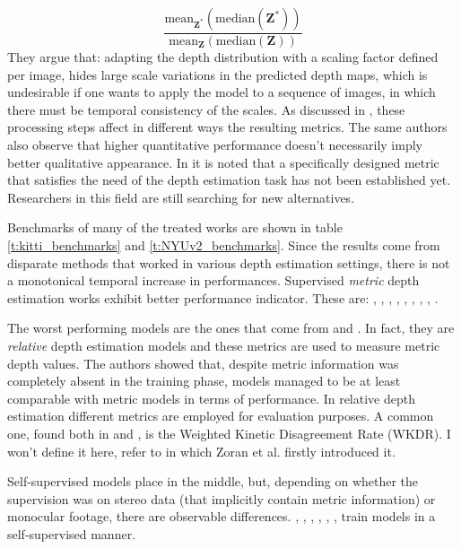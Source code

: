 \[
	\frac{
		\text{mean}_{\mathbf{Z}^{*}} (\text{median} ( \mathbf{Z}^{*}))
	}{
		\text{mean}_{\mathbf{Z}} (\text{median} ( \mathbf{Z}))
	}
\]
They argue that: adapting the depth distribution with a scaling factor defined per image, hides large scale variations in the predicted depth maps, which is undesirable if one wants to apply the model to a sequence of images, in which there must be temporal consistency of the scales.
As discussed in \cite{evalStudy}, these processing steps affect in different ways the resulting metrics.
The same authors also observe that higher quantitative performance doesn't necessarily imply better qualitative appearance.
In \cite{monocular2024} it is noted that a specifically designed metric that satisfies the need of the depth estimation task has not been established yet.
Researchers in this field are still searching for new alternatives.

\vspace{0.5cm}

Benchmarks of many of the treated works are shown in table \ref{t:kitti_benchmarks} and \ref{t:NYUv2_benchmarks}.
Since the results come from disparate methods that worked in various depth estimation settings, there is not a monotonical temporal increase in performances.
Supervised \textit{metric} depth estimation works exhibit better performance indicator.
These are: \cite{Eigen}, \cite{Eigen2}, \cite{depth_as_classification}, \cite{ordinal_regression}, \cite{denseViT}, \cite{AdaBins}, \cite{Laina}, \cite{LocalBins}, \cite{ZoeDepth}.

The worst performing models are the ones that come from \cite{DIW} and \cite{ReDWeb}.
In fact, they are \textit{relative} depth estimation models and these metrics are used to measure metric depth values.
The authors showed that, despite metric information was completely absent in the training phase, models managed to be at least comparable with metric models in terms of performance.
In relative depth estimation different metrics are employed for evaluation purposes.
A common one, found both in \cite{DIW} and \cite{ReDWeb}, is the Weighted Kinetic Disagreement Rate (WKDR).
I won't define it here, refer to \cite{Zoran} in which Zoran et al. firstly introduced it.

Self-supervised models place in the middle, but, depending on whether the supervision was on stereo data (that implicitly contain metric information) or monocular footage, there are observable differences.
\cite{Garg}, \cite{MonoDepth}, \cite{MonoDepth2}, \cite{struct2depth}, \cite{vid2depth}, \cite{FeatDepth}, \cite{SfMLearner} train models in a self-supervised manner.

